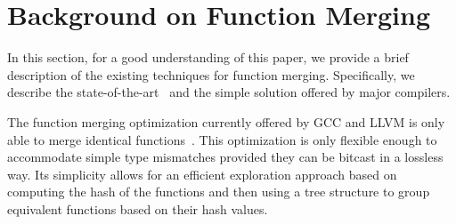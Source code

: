 \vspace{-3ex}
\section{Background on Function Merging} \label{sec:background}

In this section, for a good understanding of this paper, we provide a brief 
description of the existing techniques for function merging.
Specifically, we describe the state-of-the-art~\cite{edler14} and the
simple solution offered by major compilers.
       

The function merging optimization currently offered by GCC and LLVM is
only able to merge identical functions~\cite{llvm-fm,livska14}.
This optimization is only flexible enough to accommodate simple type mismatches
provided they can be bitcast in a lossless way.
Its simplicity allows for an efficient exploration approach based on computing
the hash of the functions and then using a tree structure to group equivalent
functions based on their hash values.

